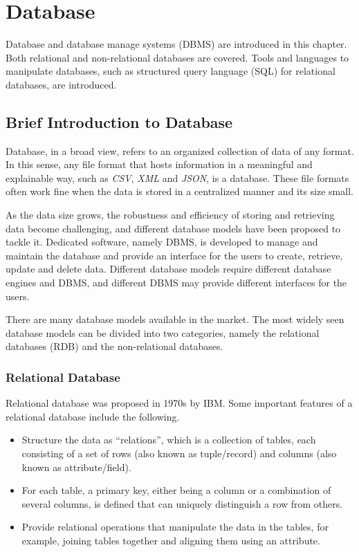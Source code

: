 \chapter{Database}

Database and database manage systems (DBMS) are introduced in this chapter. Both relational and non-relational databases are covered. Tools and languages to manipulate databases, such as structured query language (SQL) for relational databases, are introduced.

\section{Brief Introduction to Database}

Database, in a broad view, refers to an organized collection of data of any format. In this sense, any file format that hosts information in a meaningful and explainable way, such as \textit{CSV}, \textit{XML} and \textit{JSON}, is a database. These file formats often work fine when the data is stored in a centralized manner and its size small.

As the data size grows, the robustness and efficiency of storing and retrieving data become challenging, and different database models have been proposed to tackle it. Dedicated software, namely DBMS, is developed to manage and maintain the database and provide an interface for the users to create, retrieve, update and delete data. Different database models require different database engines and DBMS, and different DBMS may provide different interfaces for the users.

There are many database models available in the market. The most widely seen database models can be divided into two categories, namely the relational databases (RDB) and the non-relational databases.

\subsection{Relational Database}

Relational database was proposed in 1970s by IBM. Some important features of a relational database include the following.
\begin{itemize}
	\item Structure the data as ``relations'', which is a collection of tables, each consisting of a set of rows (also known as tuple/record) and columns (also known as attribute/field).
	\item For each table, a primary key, either being a column or a combination of several columns, is defined that can uniquely distinguish a row from others.
	\item Provide relational operations that manipulate the data in the tables, for example, joining tables together and aligning them using an attribute.
\end{itemize}

